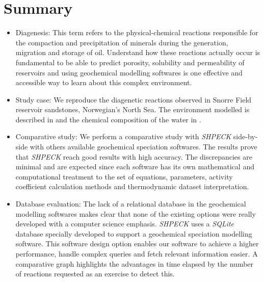 \newpage

\section{Summary}
\begin{itemize}
    \item Diagenesis: This term refers to the physical-chemical reactions responsible for the compaction and precipitation of minerals  during the generation, migration and storage of oil. Understand how these reactions actually occur is fundamental to be able to predict porosity, solubility and permeability of reservoirs and using geochemical modelling softwares is one effective and accessible way to learn about this complex environment.
    \item Study case: We reproduce the diagenetic reactions observed in Snorre Field reservoir sandstones, Norwegian's North Sea. 
    The environment modelled is described in \cite{Morad:90} and the chemical composition of the water in \cite{Nordstrom:79}.
    \item Comparative study: We perform a comparative study with \emph{SHPECK} side-by-side with others available geochemical speciation softwares. The results prove that \emph{SHPECK} reach good results with high accuracy. The discrepancies are minimal and are expected since each software has its own mathematical and computational treatment to the set of equations, parameters, activity coefficient calculation methods and thermodynamic dataset interpretation. 
    \item Database evaluation: The lack of a relational database in the geochemical modelling softwares makes clear that none of the existing options were really developed with a computer science emphasis. \emph{SHPECK} uses a \emph{SQLite} database specially developed to support a geochemical speciation modelling software. This software design option enables our software to achieve a higher performance, handle complex queries and fetch relevant information easier. A comparative graph highlights the advantages in time elapsed by the number of reactions requested as an exercise to detect this.
\end{itemize}